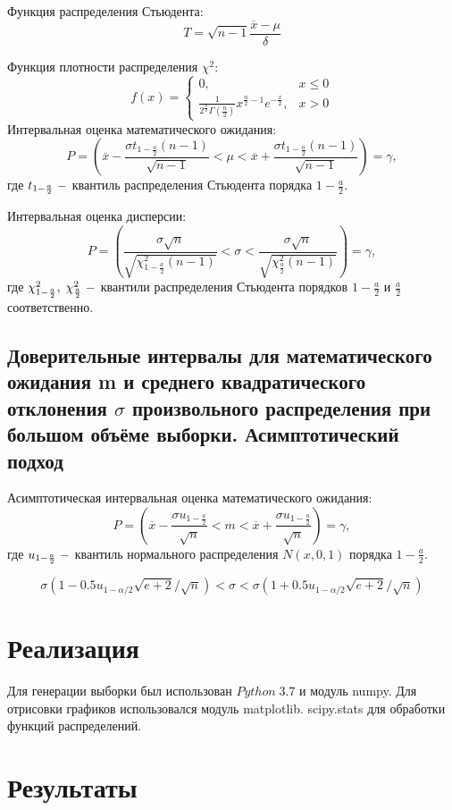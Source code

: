 \documentclass[a4]{article}
\begin{document}
						Функция распределения Стьюдента:
						$$
						T = \sqrt{n-1}\frac{\overline{x}-\mu}{\delta}
						$$
						
						Функция плотности распределения $\chi^2$:
						$$
						f(x) = \begin{cases}
						0,&x\leq 0\\
						\frac{1}{2^\frac{n}{2}\Gamma\left(\frac{n}{2}\right)}x^{\frac{n}{2}-1}e^{-\frac{x}{2}},& x>0
						\end{cases}
						$$
						Интервальная оценка математического ожидания:
						$$
						P=\left(\overline{x}-\frac{\sigma t_{1-\frac{a}{2}}(n-1)}{\sqrt{n-1}}<\mu<\overline{x}+\frac{\sigma t_{1-\frac{a}{2}}(n-1)}{\sqrt{n-1}}\right) = \gamma,
						$$
						где $t_{1-\frac{a}{2}}\;\--$ квантиль распределения Стьюдента порядка $1-\frac{a}{2}.$
						
						Интервальная оценка дисперсии:
						$$
						P=\left(\frac{\sigma\sqrt{n}}{\sqrt{\chi^2_{1-\frac{a}{2}}(n-1)}}<\sigma<\frac{\sigma\sqrt{n}}{\sqrt{\chi^2_\frac{a}{2}(n-1)}}\right) = \gamma,
						$$
						где $\chi_{1-\frac{a}{2}}^2,\;\chi_\frac{a}{2}^2\;\--$ квантили распределения Стьюдента порядков $1-\frac{a}{2}$ и $\frac{a}{2}$ соответственно.
						\subsection{Доверительные интервалы для математического ожидания m и среднего квадратического отклонения $\sigma$ произвольного распределения при большом объёме выборки. Асимптотический подход}
						
						Асимптотическая интервальная оценка математического ожидания:
						$$P = \left(\overline{x}-\frac{\sigma u_{1-\frac{a}{2}}}{\sqrt{n}}<m<\overline{x}+\frac{\sigma u_{1-\frac{a}{2}}}{\sqrt{n}}\right)=\gamma,
						$$
						где $u_{1-\frac{a}{2}}\;\--$ квантиль нормального распределения $N(x,0,1)$ порядка $1-\frac{a}{2}.$
						
						$$\sigma(1 - 0.5u_{1 - \alpha/2} \sqrt{e + 2}/ \sqrt{n}) < \sigma < \sigma(1 + 0.5u_{1 - \alpha/2} \sqrt{e + 2}/ \sqrt{n})$$
						
	\section{Реализация}
	Для генерации выборки был использован $Python\;3.7$ и модуль numpy. Для отрисовки графиков использовался модуль matplotlib. scipy.stats для обработки функций распределений.
	\section{Результаты}
\end{document}
